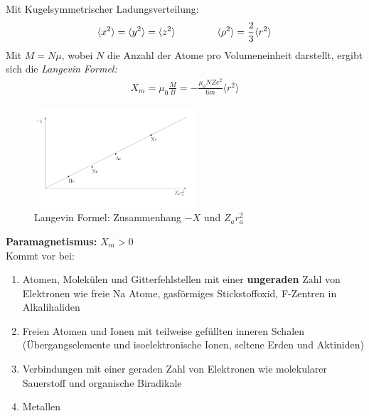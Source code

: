 Mit Kugelsymmetrischer Ladungsverteilung:
\begin{align}
    \langle x^2 \rangle = \langle y^2 \rangle = \langle z^2 \rangle \hspace{1.5 cm} \langle \rho^2 \rangle = \frac{2}{3} \langle r^2 \rangle
\end{align}
Mit $M = N \mu$, wobei $N$ die Anzahl der Atome pro Volumeneinheit darstellt, ergibt sich die \textit{Langevin Formel:}
\begin{align}
    X _m = \mu_0 \frac{M}{B} = - \frac{\mu _0 N Z e^2}{6 m} \langle r^2 \rangle
\end{align}

\begin{figure}[H]
    \centering
    \includegraphics[width=6cm]{resources/05-05-2015/Frage32_Langevin.PNG}
    \caption{Langevin Formel: Zusammenhang $- X$ und $Z_a r_a^2$}
\end{figure} \bigskip

\textbf{Paramagnetismus:} $X _m > 0$ \\
Kommt vor bei:
\begin{enumerate}
    \item Atomen, Molekülen und Gitterfehlstellen mit einer \textbf{ungeraden} Zahl von Elektronen wie freie Na Atome, gasförmiges Stickstoffoxid, F-Zentren in Alkalihaliden
    \item Freien Atomen und Ionen mit teilweise gefüllten inneren Schalen (Übergangselemente und isoelektronische Ionen, seltene Erden und Aktiniden)
    \item Verbindungen mit einer geraden Zahl von Elektronen wie molekularer Sauerstoff und organische Biradikale
    \item Metallen
\end{enumerate}

